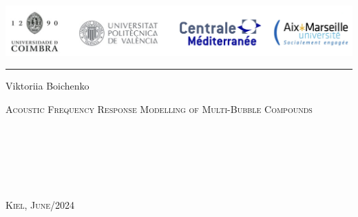 \documentclass[a4paper,11pt]{report}
\begin{document}

\begin{titlepage}

\begin{minipage}{0.96\linewidth}
\centering
\includegraphics[width=\linewidth]{figures/universities.png}
\end{minipage}
\vspace{20pt}
\hrule
\vspace{5pt}

\begin{center}
    \vfill
    {
        \LARGE{}
        \vspace{0.5cm}
        \Large
    }   


    \vfill
    
    \Large{Viktoriia Boichenko}
    
    \vfill

    \LARGE\textsc{Acoustic Frequency Response Modelling of Multi-Bubble Compounds}
    \vspace{0.5cm}
    \Large {}
\end{center}

\vfill

\begin{minipage}[t]{0.5\linewidth}
     \medskip\\
     \medskip\\
     \medskip\\
\end{minipage}
\begin{minipage}[t]{0.5\linewidth}
\end{minipage}

\vfill

\begin{minipage}[t]{0.5\linewidth}
    \textsc{} \medskip\\
\end{minipage}
\begin{minipage}[t]{0.5\linewidth}
    \large\textsc{Kiel, June/2024}\medskip\\
\end{minipage}

\end{titlepage}
   
\end{document}
